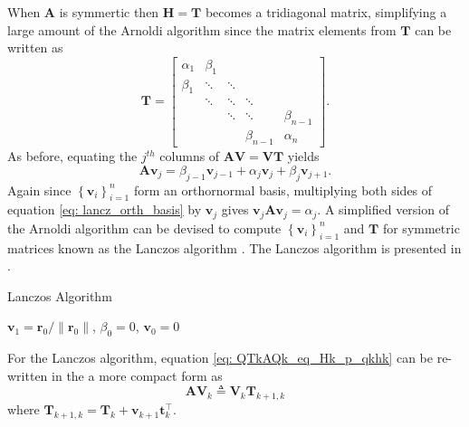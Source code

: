 When $\bm{A}$ is symmertic then $\bm{H} = \bm{T}$ becomes a tridiagonal matrix, simplifying a large amount of the Arnoldi algorithm since the matrix elements from $\bm{T}$ can be written as
\[
    \bm{T} =
    \begin{bmatrix}
        \alpha_1 & \beta_1 &        &             &             \\
        \beta_1  & \ddots  & \ddots &             &             \\
                 & \ddots  & \ddots & \ddots      &             \\
                 &         & \ddots & \ddots      & \beta_{n-1} \\
                 &         &        & \beta_{n-1} & \alpha_{n}
    \end{bmatrix}.
\]
As before, equating the $j^{th}$ columns of $\bm{A} \bm{V} = \bm{V} \bm{T}$ yields
\begin{equation}\label{eq: lancz_orth_basis}
    \bm{A} \bm{v}_{j} = \beta_{j-1} \bm{v}_{j-1} + \alpha_{j} \bm{v}_j + \beta_j \bm{v}_{j+1}.
\end{equation}
Again since $\left\{ \bm{v}_{i} \right\}_{i=1}^{n}$ form an orthornormal basis, multiplying both sides of equation \ref{eq: lancz_orth_basis} by $\bm{v}_j$ gives $\bm{v}_j \bm{A} \bm{v}_j = \alpha_j$. A simplified version of the Arnoldi algorithm can be devised to compute $\left\{ \bm{v}_{i} \right\}_{i=1}^{n}$ and $\bm{T}$ for symmetric matrices known as the Lanczos algorithm \cite{DemmelJamesW1997Anla}. The Lanczos algorithm is presented in .

{\centering
\begin{minipage}{.85\linewidth}
    \begin{algorithm}[H]
        \caption{Lanczos Algorithm}
        \label{alg: Lanczos_Algorithm}
        \SetAlgoLined
        \DontPrintSemicolon

        \BlankLine
        $\bm{v}_1 = \bm{r}_0 / \| \bm{r}_0 \|$, $\beta_0 = 0$, $\bm{v}_0 = 0$\;
        \BlankLine
    \end{algorithm}
\end{minipage}
\par
}

For the Lanczos algorithm, equation \ref{eq: QTkAQk_eq_Hk_p_qkhk} can be re-written in the a more compact form as
\begin{equation}\label{eq: AVk_eq_VkTk1k}
    \bm{A} \bm{V}_{k} \triangleq \bm{V}_{k} \bm{T}_{k+1,k}
\end{equation}
where $\bm{T}_{k+1,k} = \bm{T}_{k} + \bm{v}_{k+1} \bm{t}_{k}^{\intercal}$.
